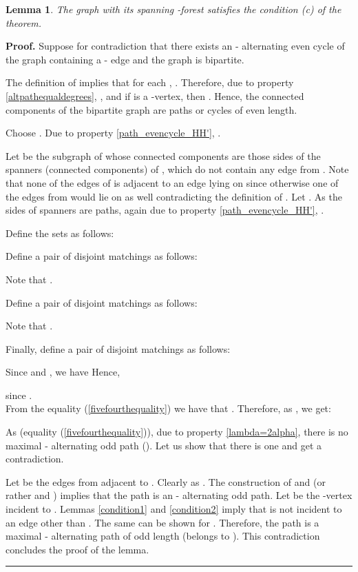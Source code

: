 \documentclass[a4paper, 12pt]{article}
\newtheorem{lemma}{Lemma}[subsection]
\newenvironment{proof}[1][Proof]{\noindent\textbf{#1.} }{\ \rule{0.5em}{0.5em}}
\begin{document}
\begin{lemma} \label{condition3}
The graph  with its spanning -forest  satisfies the
condition (c) of the theorem.
\end{lemma}
\begin{proof}
Suppose for contradiction that there exists an -
alternating even cycle  of the graph  containing a -
edge  and the graph  is bipartite.

The definition of  implies that for each , . Therefore, due to property
\ref{altpathequaldegrees}, , and if
 is a -vertex, then . Hence, the
connected components of the bipartite graph  are paths
or cycles of even length.

Choose . Due to property
\ref{path_evencycle_HH'}, .

Let  be the subgraph of  whose connected components are
those sides of the spanners (connected components)  of , which do not contain any edge from
. Note that none of the edges of  is adjacent to an edge
lying on  since otherwise one of the edges from  would lie on  as well contradicting the definition of
. Let . As the sides of spanners are
paths, again due to property \ref{path_evencycle_HH'}, .

Define the sets  as follows:



Define a pair of disjoint matchings  as follows:

 Note that .

Define a pair of disjoint matchings  as follows:

 Note that .

Finally, define a pair of disjoint matchings  as
follows:

Since  and , we have  Hence,

since . \\
From the equality (\ref{fivefourthequality}) we have that
. Therefore, as , we get:

As  (equality (\ref{fivefourthequality})),
due to property \ref{lambda=2alpha}, there is no maximal
- alternating odd path ().
Let us show that there is one and get a contradiction.

Let  be the edges from  adjacent to . Clearly
 as . The construction of
 and  (or rather  and ) implies that the path
 is an - alternating odd path. Let  be
the -vertex incident to . Lemmas \ref{condition1} and
\ref{condition2} imply that  is not incident to an edge other
than . The same can be shown for . Therefore, the path
 is a maximal - alternating path of odd
length (belongs to ). This contradiction concludes
the proof of the lemma.
\end{proof}
\end{document}

